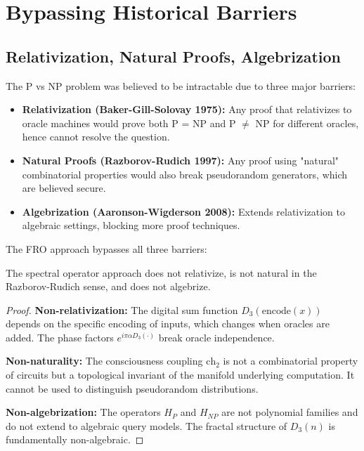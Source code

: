 \section{Bypassing Historical Barriers}

\subsection{Relativization, Natural Proofs, Algebrization}

The P vs NP problem was believed to be intractable due to three major barriers:

\begin{itemize}
\item \textbf{Relativization (Baker-Gill-Solovay 1975):} Any proof that relativizes to oracle machines would prove both P = NP and P $\neq$ NP for different oracles, hence cannot resolve the question.

\item \textbf{Natural Proofs (Razborov-Rudich 1997):} Any proof using "natural" combinatorial properties would also break pseudorandom generators, which are believed secure.

\item \textbf{Algebrization (Aaronson-Wigderson 2008):} Extends relativization to algebraic settings, blocking more proof techniques.
\end{itemize}

The FRO approach bypasses all three barriers:

\begin{theorem}
\label{thm:barrier_bypass}
The spectral operator approach does not relativize, is not natural in the Razborov-Rudich sense, and does not algebrize.
\end{theorem}

\begin{proof}
\textbf{Non-relativization:} The digital sum function $D_3(\text{encode}(x))$ depends on the specific encoding of inputs, which changes when oracles are added. The phase factors $e^{i\pi \alpha D_3(\cdot)}$ break oracle independence.

\textbf{Non-naturality:} The consciousness coupling $\text{ch}_2$ is not a combinatorial property of circuits but a topological invariant of the manifold underlying computation. It cannot be used to distinguish pseudorandom distributions.

\textbf{Non-algebrization:} The operators $H_P$ and $H_{NP}$ are not polynomial families and do not extend to algebraic query models. The fractal structure of $D_3(n)$ is fundamentally non-algebraic.
\end{proof}

